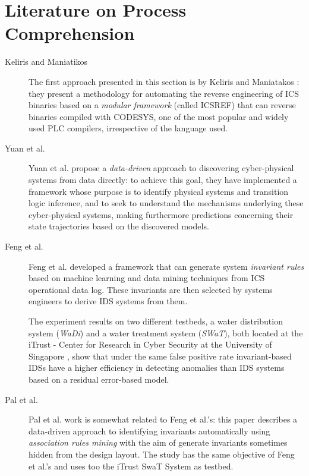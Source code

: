 \section{Literature on Process Comprehension}
\label{sec:related_work}
\begin{description}
	\item[Keliris and Maniatikos] The first approach presented in this section is by Keliris and Maniatakos \cite{keliris_maniatakos}: they present a methodology for automating the reverse engineering of ICS binaries based on a \textit{modular framework} (called ICSREF) that can reverse binaries compiled with CODESYS, one of the most popular and widely used PLC compilers, irrespective of the language used.
	
	\item[Yuan et al.] Yuan et al. \cite{yuan_et_al} propose a \textit{data-driven} approach to discovering cyber-physical systems from data directly: to achieve this goal, they have implemented a framework whose purpose is to identify physical systems and transition logic inference, and to seek to understand the mechanisms underlying these cyber-physical systems, making furthermore predictions concerning their state trajectories based on the discovered models.
	
	\item[Feng et al.] Feng et al. \cite{feng_swat} developed a framework that can generate system \textit{invariant rules} based on machine learning and data mining techniques from ICS operational data log. These invariants are then selected by systems engineers to derive IDS systems from them.
	
	The experiment results on two different testbeds, a water distribution system (\textit{WaDi}) and a water treatment system (\textit{SWaT}), both located at the iTrust - Center for Research in Cyber Security at the University of Singapore \cite{itrust_site}, show that under the same false positive rate invariant-based IDSs have a higher efficiency in detecting anomalies than IDS systems based on a residual error-based model. 
	
	\item[Pal et al.] Pal et al. \cite{pal_et_al} work is somewhat related to Feng et al.'s: this paper describes a data-driven approach to identifying invariants automatically using \textit{association rules mining} \cite{association_rules_mining} with the aim of generate invariants sometimes hidden from the design layout. The study has the same objective of Feng et al.'s and uses too the iTrust SwaT System as testbed.
	

\end{description}
